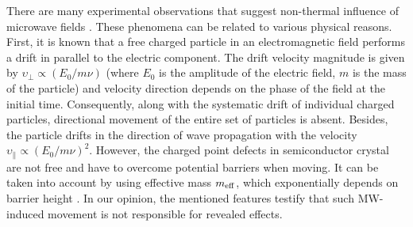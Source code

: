 \documentclass[10pt]{iopart}
\begin{document}
There are many experimental observations that suggest
non-thermal influence of microwave fields \cite{MW:Si2018,MWT:Rew2001}.
These phenomena can be related to various physical reasons.
First, it is known \cite{MW:Force,Milenin:SPQEO2020} that a free charged particle in an electromagnetic field
performs a drift in parallel to the electric component.
The drift velocity magnitude is given by $\upsilon_{\bot}\propto (E_0/m \nu)$
(where
$E_0$ is the amplitude of the electric field,
$m$ is the mass of the particle)
and velocity direction depends on the phase
of the field at the initial time.
Consequently, along with the systematic drift of individual charged
particles, directional movement of the entire
set of particles is absent.
Besides, the particle drifts in the direction of
wave propagation with the velocity $\upsilon_\|\propto(E_0/m \nu)^2$.
However, the charged point defects in
semiconductor crystal are not free and
have to overcome potential barriers when moving.
It can be taken into account by using effective
mass $m_{\rm eff}$, which exponentially depends on barrier height \cite{Milenin:SPQEO2020}.
In our opinion, the mentioned features testify that
such MW-induced movement is not responsible for revealed effects.
\end{document}
